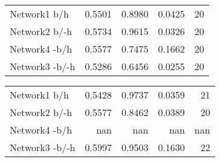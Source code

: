\begin{table*}[h]
\begin{minipage}[h]{0.45\linewidth}
\begin{tabular}{lrrrr}
 Network1 b/h           &   0.5501 &      0.8980 &   0.0425 & 20 \\
 Network2 b/-h        &   0.5734 &      0.9615 &   0.0326 & 20 \\
 Network4 -b/h         &   0.5577 &      0.7475 &   0.1662 & 20 \\
 Network3 -b/-h       &   0.5286 &      0.6456 &   0.0255 & 20 \\
\hline
\end{tabular}
\end{minipage}
\hspace{0.8cm}
\begin{minipage}[h]{0.45\linewidth}
\begin{tabular}{lrrrr}
 Network1 b/h         &   0.5428 &      0.9737 &   0.0359 &  21 \\
 Network2 b/-h      &   0.5577 &      0.8462 &   0.0389 &  20 \\
 Network4 -b/h       & nan      &    nan      & nan      & nan      \\
 Network3 -b/-h     &   0.5997 &      0.9503 &   0.1630 &  22 \\
\hline
\end{tabular}
\end{minipage}
\end{table*}

